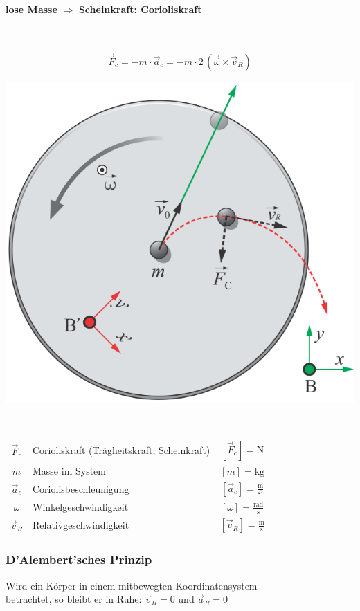 			\textbf{lose Masse} $\Rightarrow$ \textbf{Scheinkraft: Corioliskraft} \\	
				\\
				\\
				\begin{minipage}{0.48\linewidth}
					$$ \boxed{\vec{F}_c = - m \cdot \vec{a}_c = - m \cdot 2 \, (\vec{\omega} \times \vec{v}_R)} $$ 
				\end{minipage}
				\hfill
				\begin{minipage}{0.48\linewidth}
					\includegraphics[width=0.75\linewidth]{Bilder/corioliskraft} \\
				\end{minipage}
				\\
				\begin{tabular}{c l c}
					$\vec{F}_c$ & Corioliskraft (Trägheitskraft; Scheinkraft) & $[\vec{F}_c] = \mathrm{N}$ \\
					$m$ & Masse im System & $[m] = \mathrm{kg}$ \\
					$\vec{a}_c$ & Coriolisbeschleunigung & $[\vec{a}_c] = \mathrm{\frac{m}{s^2}}$ \\
					$\omega$ & Winkelgeschwindigkeit & $[\omega] = \mathrm{\frac{rad}{s}}$ \\
					$\vec{v}_R$ & Relativgeschwindigkeit & $[\vec{v}_R] = \mathrm{\frac{m}{s}}$ \\ 
				\end{tabular}

		\subsubsection{D'Alembert'sches Prinzip}
			Wird ein Körper in einem mitbewegten Koordinatensystem \\
			betrachtet, so bleibt er in Ruhe: \quad $\vec{v}_R = 0$ und $\vec{a}_R = 0$ \\
			
